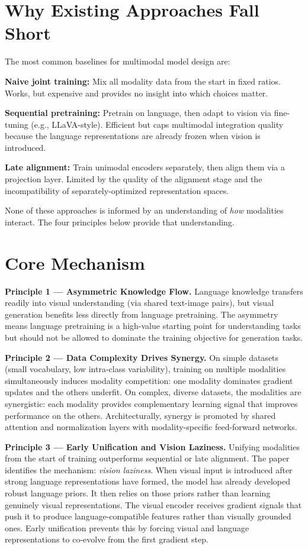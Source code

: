 \documentclass[10pt,twocolumn]{article}
\begin{document}
\section{Why Existing Approaches Fall Short}

The most common baselines for multimodal model design are:

\textbf{Naive joint training:} Mix all modality data from the start in fixed ratios.
Works, but expensive and provides no insight into which choices matter.

\textbf{Sequential pretraining:} Pretrain on language, then adapt to vision via
fine-tuning (e.g., LLaVA-style). Efficient but caps multimodal integration quality
because the language representations are already frozen when vision is introduced.

\textbf{Late alignment:} Train unimodal encoders separately, then align them via
a projection layer. Limited by the quality of the alignment stage and the
incompatibility of separately-optimized representation spaces.

None of these approaches is informed by an understanding of \emph{how} modalities
interact. The four principles below provide that understanding.

\section{Core Mechanism}

\textbf{Principle 1 --- Asymmetric Knowledge Flow.}
Language knowledge transfers readily into visual understanding (via shared
text-image pairs), but visual generation benefits less directly from language
pretraining. The asymmetry means language pretraining is a high-value starting
point for understanding tasks but should not be allowed to dominate the training
objective for generation tasks.

\textbf{Principle 2 --- Data Complexity Drives Synergy.}
On simple datasets (small vocabulary, low intra-class variability), training on
multiple modalities simultaneously induces modality competition: one modality
dominates gradient updates and the others underfit. On complex, diverse datasets,
the modalities are synergistic: each modality provides complementary learning
signal that improves performance on the others. Architecturally, synergy is
promoted by shared attention and normalization layers with modality-specific
feed-forward networks.

\textbf{Principle 3 --- Early Unification and Vision Laziness.}
Unifying modalities from the start of training outperforms sequential or late
alignment. The paper identifies the mechanism: \emph{vision laziness}. When
visual input is introduced after strong language representations have formed,
the model has already developed robust language priors. It then relies on those
priors rather than learning genuinely visual representations. The visual encoder
receives gradient signals that push it to produce language-compatible features
rather than visually grounded ones. Early unification prevents this by forcing
visual and language representations to co-evolve from the first gradient step.
\end{document}
